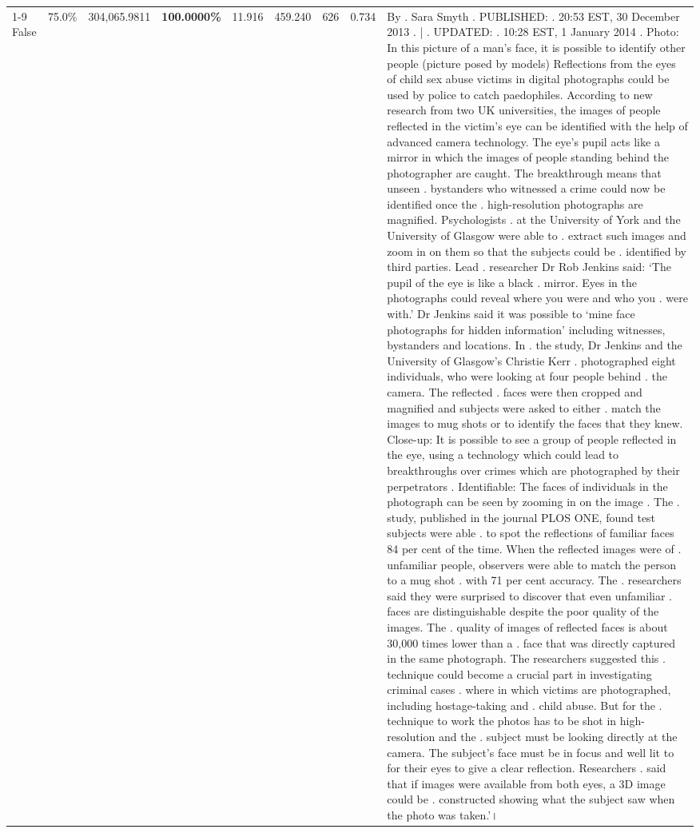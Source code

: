 \begin{table}[H]
\begin{tabular}{lllrlllll}
\cline{1-9}
False & 75.0\% & 304,065.9811 & \bfseries \color{red} 100.0000\% & 11.916 & 459.240 & 626 & 0.734 & By . Sara Smyth . PUBLISHED: . 20:53 EST, 30 December 2013 . | . UPDATED: . 10:28 EST, 1 January 2014 . Photo: In this picture of a man's face, it is possible to identify other people (picture posed by models) Reflections from the eyes of child sex abuse victims in digital photographs could be used by police to catch paedophiles. According to new research from two UK universities, the images of people reflected in the victim's eye can be identified with the help of advanced camera technology. The eye's pupil acts like a mirror in which the images of people standing behind the photographer are caught. The breakthrough means that unseen . bystanders who witnessed a crime could now be identified once the . high-resolution photographs are magnified. Psychologists . at the University of York and the University of Glasgow were able to . extract such images and zoom in on them so that the subjects could be . identified by third parties. Lead . researcher Dr Rob Jenkins said: ‘The pupil of the eye is like a black . mirror. Eyes in the photographs could reveal where you were and who you . were with.' Dr Jenkins said it was possible to ‘mine face photographs for hidden information' including witnesses, bystanders and locations. In . the study, Dr Jenkins and the University of Glasgow's Christie Kerr . photographed eight individuals, who were looking at four people behind . the camera. The reflected . faces were then cropped and magnified and subjects were asked to either . match the images to mug shots or to identify the faces that they knew. Close-up: It is possible to see a group of people reflected in the eye, using a technology which could lead to breakthroughs over crimes which are photographed by their perpetrators . Identifiable: The faces of individuals in the photograph can be seen by zooming in on the image . The . study, published in the journal PLOS ONE, found test subjects were able . to spot the reflections of familiar faces 84 per cent of the time. When the reflected images were of . unfamiliar people, observers were able to match the person to a mug shot . with 71 per cent accuracy. The . researchers said they were surprised to discover that even unfamiliar . faces are distinguishable despite the poor quality of the images. The . quality of images of reflected faces is about 30,000 times lower than a . face that was directly captured in the same photograph. The researchers suggested this . technique could become a crucial part in investigating criminal cases . where in which victims are photographed, including hostage-taking and . child abuse. But for the . technique to work the photos has to be shot in high-resolution and the . subject must be looking directly at the camera. The subject's face must be in focus and well lit to for their eyes to give a clear reflection. Researchers . said that if images were available from both eyes, a 3D image could be . constructed showing what the subject saw when the photo was taken.’। \\

\end{tabular}
\end{table}
